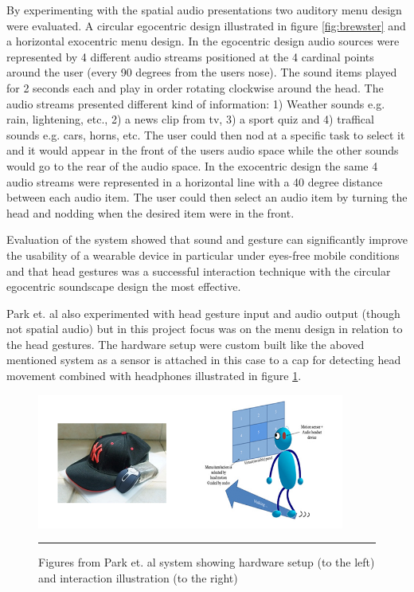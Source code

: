By experimenting with the spatial audio presentations two auditory menu design were evaluated. A circular egocentric design illustrated in figure \ref{fig:brewster} and a horizontal exocentric menu design. In the egocentric design audio sources were represented by 4 different audio streams positioned at the 4 cardinal points around the user (every 90 degrees from the users nose). The sound items played for 2 seconds each and play in order rotating clockwise around the head. The audio streams presented different kind of information: 1) Weather sounds e.g. rain, lightening, etc., 2) a news clip from tv, 3) a sport quiz and 4) traffical sounds e.g. cars, horns, etc. The user could then nod at a specific task to select it and it would appear in the front of the users audio space while the other sounds would go to the rear of the audio space. In the exocentric design the same 4 audio streams were represented in a horizontal line with a 40 degree distance between each audio item. The user could then select an audio item by turning the head and nodding when the desired item were in the front.

Evaluation of the system showed that sound and gesture can significantly improve the usability of a wearable device in particular under eyes-free mobile conditions and that head gestures was a successful interaction technique with the circular egocentric soundscape design the most effective.

Park et. al \cite{park_gaze-directed_2011} also experimented with head gesture input and audio output (though not spatial audio) but in this project focus was on the menu design in relation to the head gestures. The hardware setup were custom built like the aboved mentioned system as a sensor is attached in this case to a cap for detecting head movement combined with headphones illustrated in figure \ref{fig:park}.

\begin{figure}[t]
	\centering
		\includegraphics[width=0.9\textwidth,height=\textheight,keepaspectratio]{./Figures/park-system.png}
		\rule{35em}{0.5pt}
	\caption[Park system]{Figures from Park et. al \cite{park_gaze-directed_2011} system showing hardware setup (to the left) and interaction illustration (to the right)}
	\label{fig:park}
\end{figure}

